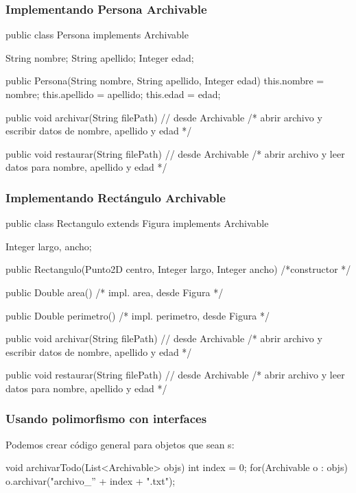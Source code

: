 \documentclass{beamer}
\begin{document}
\begin{frame}[fragile]
  \frametitle{Implementando Persona Archivable}
  \begin{jsmall}
    public class Persona implements Archivable {
      String nombre;
      String apellido;
      Integer edad;

      public Persona(String nombre, String apellido, Integer edad) {
        this.nombre = nombre;
        this.apellido = apellido;
        this.edad = edad;
      }

      public void archivar(String filePath) { // desde Archivable
        /* abrir archivo y escribir datos de nombre, apellido y edad */
      }

      public void restaurar(String filePath) { // desde Archivable
        /* abrir archivo y leer datos para nombre, apellido y edad */
      }
    }    
  \end{jsmall}  
\end{frame}

\begin{frame}[fragile]
  \frametitle{Implementando Rectángulo Archivable}
  \begin{jsmall}
    public class Rectangulo extends Figura implements Archivable {
      Integer largo, ancho;
      
      public Rectangulo(Punto2D centro, Integer largo, Integer ancho) {
        /*constructor */
      }

      public Double area() { /* impl. area, desde Figura */ }
      
      public Double perimetro() { /* impl. perimetro, desde Figura */ }

      public void archivar(String filePath) { // desde Archivable
        /* abrir archivo y escribir datos de nombre, apellido y edad */
      }

      public void restaurar(String filePath) { // desde Archivable
        /* abrir archivo y leer datos para nombre, apellido y edad */
      }       
    }
  \end{jsmall}  
\end{frame}

\begin{frame}[fragile]
  \frametitle{Usando polimorfismo con interfaces}

  Podemos crear código general para objetos que sean
  s:

  \begin{jsmall}
    void archivarTodo(List<Archivable> objs) {
      int index = 0;
      for(Archivable o : objs) {
        o.archivar("archivo_'' + index + ".txt");
      }      
    }    
  \end{jsmall}
\end{frame}
\end{document}
